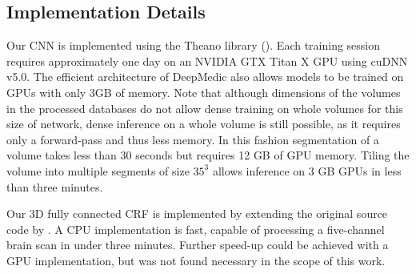 

\subsection{Implementation Details}
 
Our CNN is implemented using the Theano library (\cite{Bastien-Theano-2012}). Each training session requires approximately one day on an NVIDIA GTX Titan X GPU using cuDNN v5.0. The efficient architecture of DeepMedic also allows models to be trained on GPUs with only 3GB of memory. Note that although dimensions of the volumes in the processed databases do not allow dense training on whole volumes for this size of network, dense inference on a whole volume is still possible, as it requires only a forward-pass and thus less memory. In this fashion segmentation of a volume takes less than 30 seconds but requires 12 GB of GPU memory. Tiling the volume into multiple segments of size $35^3$ allows inference on 3 GB GPUs in less than three minutes.

Our 3D fully connected CRF is implemented by extending the original source code by \cite{Krahenbuhl2013}. A CPU implementation is fast, capable of processing a five-channel brain scan in under three minutes. Further speed-up could be achieved with a GPU implementation, but was not found necessary in the scope of this work.
